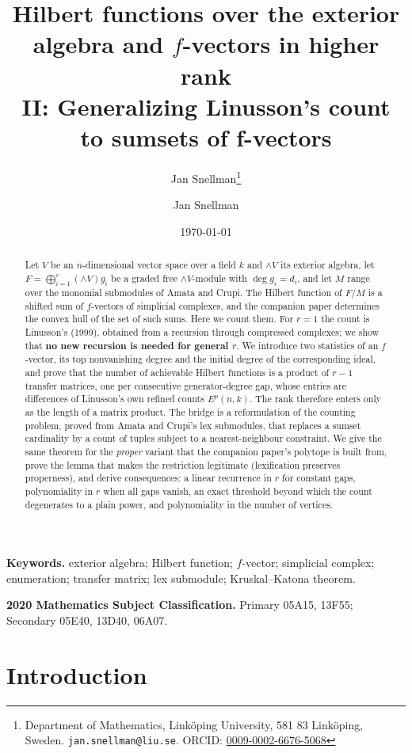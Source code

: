\documentclass[11pt, a4paper, abstract=yes]{scrartcl}
\author{Jan Snellman\thanks{Department of Mathematics, Linköping University, 581 83 Linköping, Sweden. \texttt{jan.snellman@liu.se}. ORCID: \href{https://orcid.org/0009-0002-6676-5068}{0009-0002-6676-5068}}}
\author{Jan Snellman \orcidlink{0009-0002-6676-5068}}
\date{\today}
\title{Hilbert functions over the exterior algebra and \(f\)-vectors in higher rank\\\medskip
\large II: Generalizing Linusson's count to sumsets of f-vectors}
\theoremstyle{definition}
\theoremstyle{remark}
\theoremstyle{plain}
\newcommand{\Ext}{\mathord{\wedge }V}
\begin{document}
\maketitle
\begin{abstract}
Let \(V\) be an \(n\)-dimensional vector space over a field \(k\) and \(\Ext\) its exterior algebra,
let \(F=\bigoplus_{i=1}^{r}(\Ext)g_i\) be a graded free \(\Ext\)-module with \(\deg g_i=d_i\), and let \(M\)
range over the monomial submodules of Amata and Crupi. The Hilbert function of \(F/M\) is a shifted
sum of \(f\)-vectors of simplicial complexes, and the companion paper \autocite{SnellmanArticle1} determines the convex hull of the
set of such sums. Here we count them. For \(r=1\) the count is Linusson's (1999), obtained from a
recursion through compressed complexes; we show that \textbf{no new recursion is needed for general
\(r\)}. We introduce two statistics of an \(f\)-vector, its top nonvanishing degree and the initial
degree of the corresponding ideal, and prove that the number of achievable Hilbert functions is a
product of \(r-1\) transfer matrices, one per consecutive generator-degree gap, whose entries are
differences of Linusson's own refined counts \(E^p(n,k)\). The rank therefore enters only as the
length of a matrix product. The bridge is a reformulation of the counting problem, proved from
Amata and Crupi's lex submodules, that replaces a sumset cardinality by a count of tuples subject to
a nearest-neighbour constraint. We give the same theorem for the \emph{proper} variant that the companion
paper's polytope is built from, prove the lemma that makes the restriction legitimate (lexification
preserves properness), and derive consequences: a linear recurrence in \(r\) for
constant gaps, polynomiality in \(r\) when all gaps vanish, an exact threshold beyond which the count
degenerates to a plain power, and polynomiality in the number of vertices.
\end{abstract}

\medskip\noindent\textbf{Keywords.} exterior algebra; Hilbert function; \(f\)-vector; simplicial
complex; enumeration; transfer matrix; lex submodule; Kruskal--Katona theorem.

\smallskip\noindent\textbf{2020 Mathematics Subject Classification.} Primary 05A15, 13F55;
Secondary 05E40, 13D40, 06A07.
\medskip

\setcounter{tocdepth}{2}
\tableofcontents
\section{Introduction}
\label{sec-intro}
\end{document}
